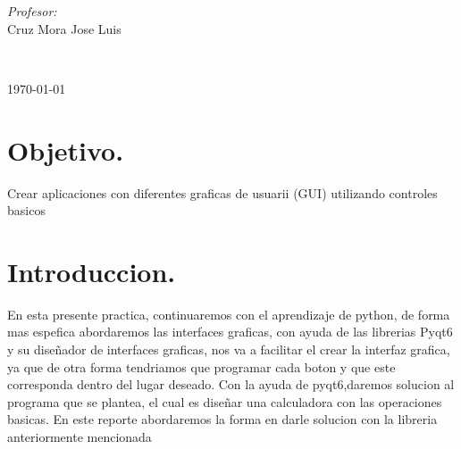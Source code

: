 \documentclass[11pt]{article}
\begin{document}
\begin{center}
\begin{minipage}{0.46\textwidth}
\begin{flushleft}
\end{flushleft}																		%
\end{minipage}		
\begin{minipage}{0.52\textwidth}		
\vspace{-0.6cm}											%
\begin{flushright} \large															%
\emph{Profesor:} \\																	%
Cruz Mora Jose Luis\\
\end{flushright}																	%
\end{minipage}	
\vspace*{1cm}
 	
 		\\																		%
\vspace{2cm} 																				
\begin{center}																					
{\large \today}																	%
 			\end{center}												  						
\end{center}							 											
																					
\newpage																		

\tableofcontents 

\newpage

\section{Objetivo.}

Crear aplicaciones con diferentes graficas de usuarii (GUI) utilizando controles basicos

\section{Introduccion.} 
En esta presente practica, continuaremos con el aprendizaje de  python, de forma mas espefica abordaremos las interfaces graficas, con ayuda de las librerias Pyqt6 y su diseñador  de interfaces  graficas, nos va a facilitar el crear la interfaz grafica, ya que de otra forma tendriamos que programar cada boton y que este corresponda dentro del lugar deseado. Con la ayuda de pyqt6,daremos solucion al programa que se plantea, el cual es diseñar una calculadora con las operaciones basicas. En este reporte abordaremos la forma en darle solucion con la libreria anteriormente mencionada 
\end{document}
